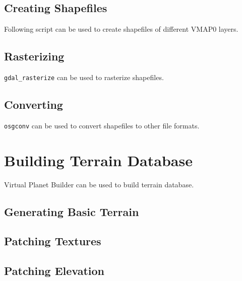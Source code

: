 \subsection{Creating Shapefiles}

Following script can be used to create shapefiles of different VMAP0 layers.

\begin{codelistbash}
  
\end{codelistbash}

\subsection{Rasterizing}

\texttt{gdal\_rasterize} can be used to rasterize shapefiles.

\begin{codelistbash}
  
\end{codelistbash}

\subsection{Converting}

\texttt{osgconv} can be used to convert shapefiles to other file formats.

\begin{codelistbash}
  
\end{codelistbash}

\section{Building Terrain Database}

Virtual Planet Builder can be used to build terrain database.

\subsection{Generating Basic Terrain}

\begin{codelistbash}
  
\end{codelistbash}

\subsection{Patching Textures}

\begin{codelistbash}
  
\end{codelistbash}

\subsection{Patching Elevation}

\begin{codelistbash}
  
\end{codelistbash}

